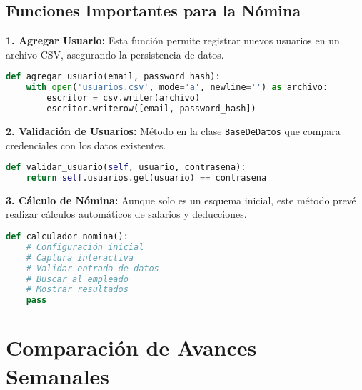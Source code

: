 \documentclass[a4paper,12pt]{article}
\begin{document}
\subsection{Funciones Importantes para la Nómina}

\textbf{1. Agregar Usuario:} Esta función permite registrar nuevos usuarios en un archivo CSV, asegurando la persistencia de datos.

\begin{lstlisting}[language=Python, caption={Función agregar\_usuario}]
def agregar_usuario(email, password_hash):
    with open('usuarios.csv', mode='a', newline='') as archivo:
        escritor = csv.writer(archivo)
        escritor.writerow([email, password_hash])
\end{lstlisting}

\textbf{2. Validación de Usuarios:} Método en la clase \texttt{BaseDeDatos} que compara credenciales con los datos existentes.

\begin{lstlisting}[language=Python, caption={Método validar\_usuario}]
def validar_usuario(self, usuario, contrasena):
    return self.usuarios.get(usuario) == contrasena
\end{lstlisting}

\textbf{3. Cálculo de Nómina:} Aunque solo es un esquema inicial, este método prevé realizar cálculos automáticos de salarios y deducciones.

\begin{lstlisting}[language=Python, caption={Esquema inicial para el cálculo de nómina}]
def calculador_nomina():
    # Configuración inicial
    # Captura interactiva
    # Validar entrada de datos
    # Buscar al empleado
    # Mostrar resultados
    pass
\end{lstlisting}

\section{Comparación de Avances Semanales}
\end{document}
